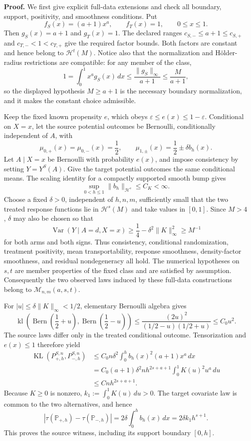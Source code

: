 \textbf{Proof.}
We first give explicit full-data extensions and check all boundary, support, positivity, and smoothness conditions.  Put
\[
 f_S(x)=(a+1)x^a,\qquad f_T(x)=1,\qquad 0\le x\le1.
\]
Then \(g_S(x)=a+1\) and \(g_T(x)=1\).  The declared ranges
\(c_{S,-}\le a+1\le c_{S,+}\) and
\(c_{T,-}<1<c_{T,+}\) give the required factor bounds.  Both factors are constant and hence belong to \(\mathcal H^t(M)\).  Notice also that the normalization and H\"older-radius restrictions are compatible: for any member of the class,
\[
 1=\int_0^1x^ag_S(x)\,dx
 \le \frac{\lVert g_S\rVert_\infty}{a+1}
 \le \frac{M}{a+1},
\]
so the displayed hypothesis \(M\ge a+1\) is the necessary boundary normalization, and it makes the constant choice admissible.

Keep the fixed known propensity \(e\), which obeys
\(\varepsilon\le e(x)\le1-\varepsilon\).  Conditional on \(X=x\), let the source potential outcomes be Bernoulli, conditionally independent of \(A\), with
\[
 \mu_{0,+}(x)=\mu_{0,-}(x)=\frac12,
 \qquad
 \mu_{1,\pm}(x)=\frac12\pm\delta b_h(x).
\]
Let \(A\mid X=x\) be Bernoulli with probability \(e(x)\), and impose consistency by setting \(Y=Y^S(A)\).  Give the target potential outcomes the same conditional means.  The scaling identity for a compactly supported smooth bump gives
\[
 \sup_{0<h\le1}\lVert b_h\rVert_{\mathcal H^s}
 \le C_K<\infty.
\]
Choose a fixed \(\delta>0\), independent of \(h,n,m\), sufficiently small that the two treated response functions lie in \(\mathcal H^s(M)\) and take values in \([0,1]\).  Since \(M>4\), \(\delta\) may also be chosen so that
\[
 \operatorname{Var}(Y\mid A=d,X=x)
 \ge \frac14-\delta^2\lVert K\rVert_\infty^2
 \ge M^{-1}
\]
for both arms and both signs.  Thus consistency, conditional randomization, treatment positivity, mean transportability, response smoothness, density-factor smoothness, and residual nondegeneracy all hold.  The numerical hypotheses on \(s,t\) are member properties of the fixed class and are satisfied by assumption.  Consequently the two observed laws induced by these full-data constructions belong to \(\mathcal M_{n,m}(a,s,t)\).

For \(|u|\le\delta\lVert K\rVert_\infty<1/2\), elementary Bernoulli algebra gives
\[
 \operatorname{kl}\!\left(\operatorname{Bern}\!\left(\frac12+u\right),
 \operatorname{Bern}\!\left(\frac12-u\right)\right)
 \le
 \frac{(2u)^2}{(1/2-u)(1/2+u)}
 \le C_0u^2.
\]
The source laws differ only in the treated conditional outcome.  Tensorization and \(e(x)\le1\) therefore yield
\[
\begin{aligned}
 \operatorname{KL}(P_{+,h}^{S,n},P_{-,h}^{S,n})
 &\le C_0n\delta^2\int_0^hb_h(x)^2(a+1)x^a\,dx\\
 &=C_0(a+1)\delta^2nh^{2s+a+1}
   \int_0^1K(u)^2u^a\,du\\
 &\le Cnh^{2s+a+1}.
\end{aligned}
\]
Because \(K\ge0\) is nonzero,
\(k_1:=\int_0^1K(u)\,du>0\).  The target covariate law is common to the two alternatives, and hence
\[
 \left|\tau(\mathbb P_{+,h})-\tau(\mathbb P_{-,h})\right|
 =2\delta\int_0^hb_h(x)\,dx
 =2\delta k_1h^{s+1}.
\]
This proves the source witness, including its support boundary \([0,h]\).

